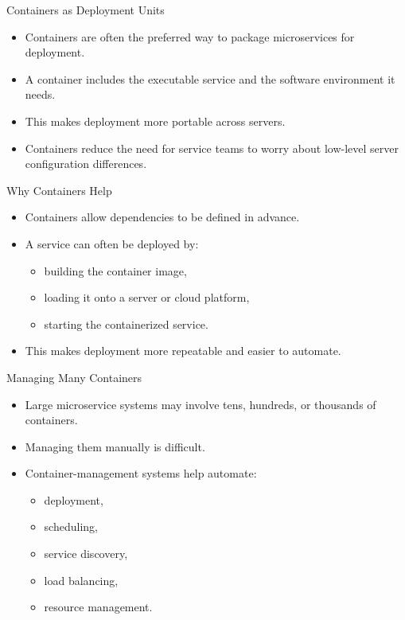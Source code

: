 \begin{frame}{Containers as Deployment Units}
\begin{itemize}
    \item Containers are often the preferred way to package microservices for deployment.
    \item A container includes the executable service and the software environment it needs.
    \item This makes deployment more portable across servers.
    \item Containers reduce the need for service teams to worry about low-level server configuration differences.
\end{itemize}
\end{frame}

\begin{frame}{Why Containers Help}
\begin{itemize}
    \item Containers allow dependencies to be defined in advance.
    \item A service can often be deployed by:
    \begin{itemize}
        \item building the container image,
        \item loading it onto a server or cloud platform,
        \item starting the containerized service.
    \end{itemize}
    \item This makes deployment more repeatable and easier to automate.
\end{itemize}
\end{frame}

\begin{frame}{Managing Many Containers}
\begin{itemize}
    \item Large microservice systems may involve tens, hundreds, or thousands of containers.
    \item Managing them manually is difficult.
    \item Container-management systems help automate:
    \begin{itemize}
        \item deployment,
        \item scheduling,
        \item service discovery,
        \item load balancing,
        \item resource management.
    \end{itemize}
\end{itemize}
\end{frame}


